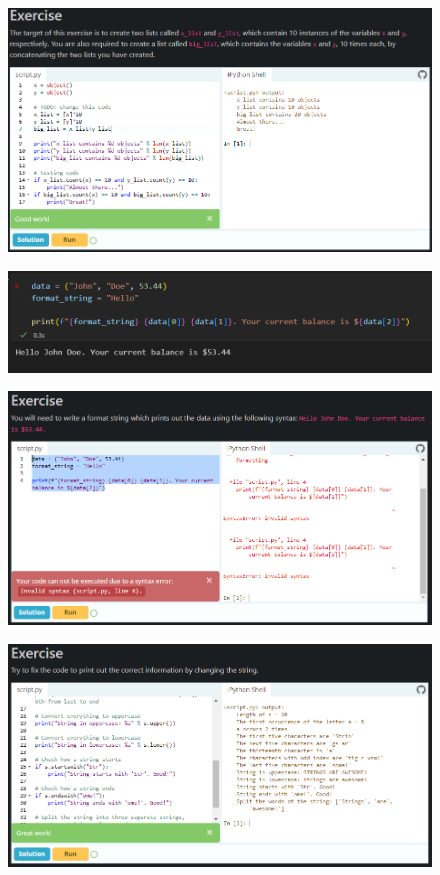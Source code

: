 \documentclass[12pt, a4paper]{article}
\begin{document}
\pagebreak
\begin{figure}[h]
\centering
\includegraphics[width=6in]{images/q4.png}
\end{figure}
\pagebreak
\begin{figure}[h]
\centering
\includegraphics[width=6in]{images/q5(part1).png}
\end{figure}
\begin{figure}[h]
\centering
\includegraphics[width=6in]{images/q5(part2).png}
\end{figure}
\pagebreak
\begin{figure}[h]
\centering
\includegraphics[width=6in]{images/q6.png}
\end{figure}
\end{document}
